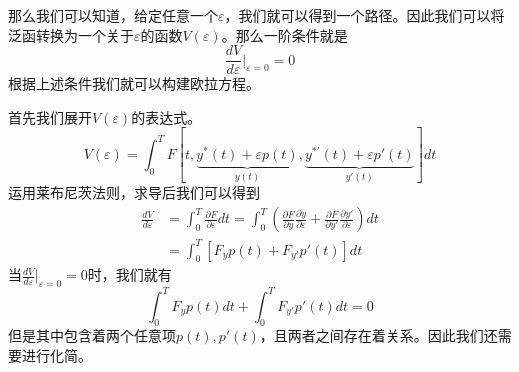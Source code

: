 \documentclass[UTF8,12pt]{ctexart}
\numberwithin{equation}{section} %
\numberwithin{figure}{section}
\numberwithin{table}{section}
\begin{document}
	那么我们可以知道，给定任意一个$\varepsilon$，我们就可以得到一个路径。因此我们可以将泛函转换为一个关于$\varepsilon$的函数$V(\varepsilon)$。那么一阶条件就是
	\begin{equation}
		\frac{dV}{d\varepsilon} |_{\varepsilon = 0} = 0
	\end{equation}
	根据上述条件我们就可以构建欧拉方程。
	
	首先我们展开$V(\varepsilon)$的表达式。
	\begin{equation}
		V(\varepsilon) =\int_{0}^{T}F[t,\underbrace{y^*(t) + \varepsilon p(t)}_{y(t)},\underbrace{y^{*'}(t) + \varepsilon p'(t)}_{y'(t)}]dt
	\end{equation}
	运用莱布尼茨法则，求导后我们可以得到
	\begin{equation}
		\begin{aligned}
			\frac{dV}{d\varepsilon} &= \int_{0}^{T}\frac{\partial F}{\partial \varepsilon}dt = \int_{0}^{T}(\frac{\partial F}{\partial y}\frac{\partial y}{\partial \varepsilon} + \frac{\partial F}{\partial y'}\frac{\partial y'}{\partial \varepsilon})dt\\ 
			&=\int_{0}^{T}[F_y p(t) + F_{y'} p'(t)]dt
		\end{aligned}
	\end{equation}
	当$\frac{dV}{d\varepsilon} |_{\varepsilon = 0} = 0$时，我们就有
	\begin{equation}
		\int_{0}^{T}F_y p(t)dt + \int_{0}^{T}F_{y'} p'(t)dt = 0
	\end{equation}
	但是其中包含着两个任意项$p(t),p'(t)$，且两者之间存在着关系。因此我们还需要进行化简。
	
\end{document}
